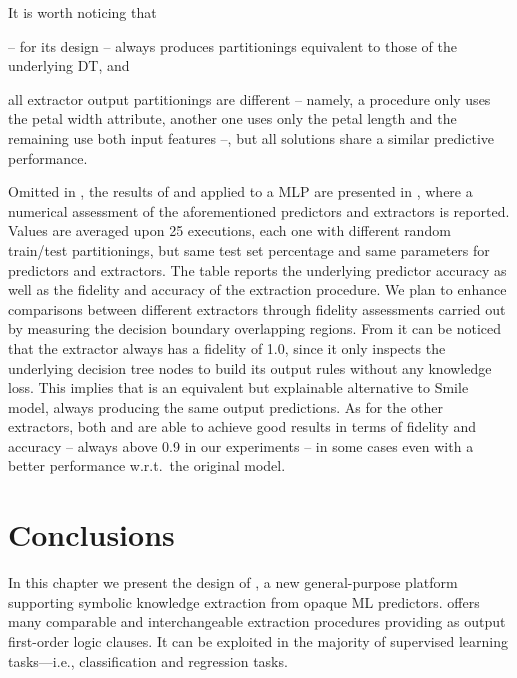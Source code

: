 \documentclass[12pt,a4paper,openright,twoside]{book}
\begin{document}
It is worth noticing that
%
\begin{inlinelist}
    \item \cart{} -- for its design -- always produces partitionings equivalent to those of the underlying DT, and
    \item all extractor output partitionings are different -- namely, a procedure only uses the petal width attribute, another one uses only the petal length and the remaining use both input features --, but all solutions share a similar predictive performance.
\end{inlinelist}

Omitted in , the results of \real{} and \trepan{} applied to a MLP are presented in , where a numerical assessment of the aforementioned predictors and extractors is reported.
%
Values are averaged upon 25 executions, each one with different random train/test partitionings, but same test set percentage and same parameters for predictors and extractors.
%
The table reports the underlying predictor accuracy as well as the fidelity and accuracy of the extraction procedure.
%
We plan to enhance comparisons between different extractors through fidelity assessments carried out by measuring the decision boundary overlapping regions.
%
From  it can be noticed that the \cart{} extractor always has a fidelity of 1.0, since it only inspects the underlying decision tree nodes to build its output rules without any knowledge loss.
%
This implies that \psyke{} \cart{} is an equivalent but explainable alternative to Smile  model, always producing the same output predictions.
%
As for the other extractors, both \real{} and \trepan{} are able to achieve good results in terms of fidelity and accuracy -- always above 0.9 in our experiments -- in some cases even with a better performance w.r.t.\ the original model.



\section{Conclusions}\label{sec:conclusions2}

In this chapter we present the design of \psyke{}, a new general-purpose platform supporting symbolic knowledge extraction from opaque ML predictors.
%
\psyke{} offers many comparable and interchangeable extraction procedures providing as output first-order logic clauses.
%
It can be exploited in the majority of supervised learning tasks---i.e., classification and regression tasks.
\end{document}
